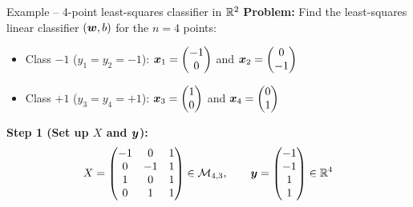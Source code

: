 \documentclass[aspectratio=169]{beamer}\usepackage[]{graphicx}\usepackage[]{xcolor}
\begin{document}
\begin{frame}{Example -- 4-point least-squares classifier in $\mathbb{R}^2$}
    \textbf{Problem:} Find the least-squares linear classifier $(\bm{w}, b)$ for the $n = 4$ points:
    \begin{itemize}
        \item Class $-1$ ($y_1 = y_2 = -1$): $\bm{x}_1 = \begin{pmatrix} -1 \\ 0 \end{pmatrix}$ and $\bm{x}_2 = \begin{pmatrix} 0 \\ -1 \end{pmatrix}$
        \item Class $+1$ ($y_3 = y_4 = +1$): $\bm{x}_3 = \begin{pmatrix} 1 \\ 0 \end{pmatrix}$ and $\bm{x}_4 = \begin{pmatrix} 0 \\ 1 \end{pmatrix}$
    \end{itemize}
    \vfill
    \textbf{Step 1 (Set up $X$ and $\bm{y}$):}
    \[
        X = \begin{pmatrix}
            -1 & 0 & 1 \\
             0 & -1 & 1 \\
             1 & 0 & 1 \\
             0 & 1 & 1
        \end{pmatrix} \in \mathcal{M}_{4, 3}, \qquad
        \bm{y} = \begin{pmatrix} -1 \\ -1 \\ 1 \\ 1 \end{pmatrix} \in \mathbb{R}^4
    \]
\end{frame}
\end{document}
